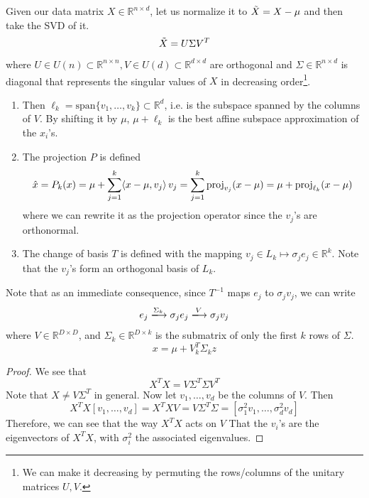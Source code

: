     \begin{theorem}
      Given our data matrix $X \in \mathbb{R}^{n \times d}$, let us normalize it to $\Tilde{X} = X - \mu$ and then take the SVD of it. 
      \begin{equation}
        \Tilde{X} = U \Sigma V^T
      \end{equation}
      where $U \in U(n) \subset \mathbb{R}^{n \times n}, V \in U(d) \subset \mathbb{R}^{d \times d}$ are orthogonal and $\Sigma \in \mathbb{R}^{n \times d}$ is diagonal that represents the singular values of $X$ in decreasing order\footnote{We can make it decreasing by permuting the rows/columns of the unitary matrices $U, V$.}. 
      \begin{enumerate}
        \item Then $\ell_k = \mathrm{span}\{v_1, \ldots, v_k\} \subset \mathbb{R}^d$, i.e. is the subspace spanned by the columns of $V$. By shifting it by $\mu$, $\mu + \ell_k$ is the best affine subspace approximation of the $x_i$'s. 

        \item The projection $P$ is defined 
        \begin{equation}
          \hat{x} = P_k (x) = \mu + \sum_{j=1}^k \langle x - \mu, v_j \rangle \, v_j = \sum_{j=1}^k \operatorname{proj}_{v_j} (x - \mu) = \mu + \operatorname{proj}_{\ell_k} (x - \mu)
        \end{equation}
        where we can rewrite it as the projection operator since the $v_j$'s are orthonormal. 

        \item The change of basis $T$ is defined with the mapping $v_j \in L_k \mapsto \sigma_j e_j \in \mathbb{R}^k$. Note that the $v_j$'s form an orthogonal basis of $L_k$. 
      \end{enumerate} 
      Note that as an immediate consequence, since $T^{-1}$ maps $e_j$ to $\sigma_j v_j$, we can write 
      \begin{equation}
        e_j \xlongrightarrow{\Sigma_k} \sigma_j e_j \xlongrightarrow{V} \sigma_j v_j
      \end{equation}
      where $V \in \mathbb{R}^{D \times D}$, and $\Sigma_k \in \mathbb{R}^{D \times k}$ is the submatrix of only the first $k$ rows of $\Sigma$. 
      \begin{equation}
        x = \mu + V_k^T \Sigma_k z
      \end{equation}
    \end{theorem}
    \begin{proof}
      We see that 
      \begin{equation}
        X^T X =  V \Sigma^T \Sigma V^T
      \end{equation}
      Note that $X \neq V \Sigma^T$ in general. Now let $v_1, \ldots, v_d$ be the columns of $V$. Then 
      \begin{equation}
        X^T X [v_1, \ldots, v_d] = X^T X V = V \Sigma^T \Sigma = [\sigma_1^2 v_1, \ldots, \sigma_d^2 v_d]
      \end{equation}
      Therefore, we can see that the way $X^T X$ acts on $V$ That the $v_i$'s are the eigenvectors of $X^T X$, with $\sigma_i^2$ the associated eigenvalues. 
    \end{proof}

